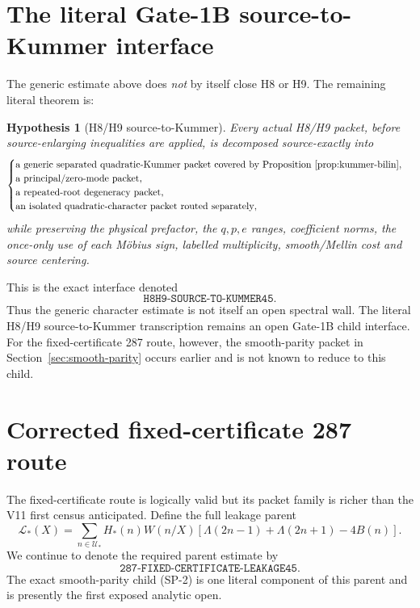 \documentclass[11pt]{article}
\newtheorem{hypothesis}[theorem]{Hypothesis}
\theoremstyle{definition}
\theoremstyle{remark}
\newcommand{\1}{\mathbf 1}
\begin{document}
\section{The literal Gate-1B source-to-Kummer interface}\label{sec:source-kummer}

The generic estimate above does \emph{not} by itself close H8 or H9.  The remaining literal theorem is:

\begin{hypothesis}[H8/H9 source-to-Kummer]\label{hyp:source-kummer}
Every actual H8/H9 packet, before source-enlarging inequalities are applied, is decomposed source-exactly into
\[
 \begin{cases}
 \text{a generic separated quadratic-Kummer packet covered by Proposition~\ref{prop:kummer-bilin}},\\
 \text{a principal/zero-mode packet},\\
 \text{a repeated-root degeneracy packet},\\
 \text{an isolated quadratic-character packet routed separately},
 \end{cases}
\]
while preserving the physical prefactor, the $q,p,e$ ranges, coefficient norms, the once-only use of each
M\"obius sign, labelled multiplicity, smooth/Mellin cost and source centering.
\end{hypothesis}

This is the exact interface denoted
\[
 \boxed{\texttt{H8H9-SOURCE-TO-KUMMER45}.}
\]
Thus the generic character estimate is not itself an open spectral wall.  The literal H8/H9 source-to-Kummer
transcription remains an open Gate-1B child interface.  For the fixed-certificate 287 route, however, the
smooth-parity packet in Section~\ref{sec:smooth-parity} occurs earlier and is not known to reduce to this child.

\section{Corrected fixed-certificate 287 route}\label{sec:fixed-leakage}

The fixed-certificate route is logically valid but its packet family is richer than the V11 first census
anticipated.  Define the full leakage parent
\[
 \boxed{
 \mathcal L_*(X)=
 \sum_{n\in\mathcal U_*}
 H_*(n)W(n/X)
 [\Lambda(2n-1)+\Lambda(2n+1)-4B(n)].
 }
 \tag{287-FCL}
\]
We continue to denote the required parent estimate by
\[
 \boxed{\texttt{287-FIXED-CERTIFICATE-LEAKAGE45}.}
\]
The exact smooth-parity child (SP-2) is one literal component of this parent and is presently the first exposed
analytic open.
\end{document}
